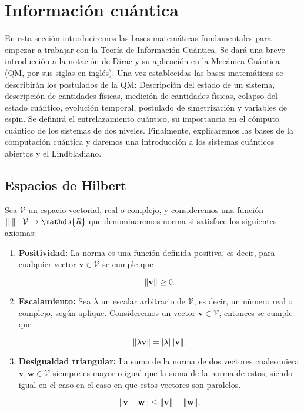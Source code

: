 \chapter{Información cuántica}

En esta sección introduciremos las bases matemáticas fundamentales para empezar a trabajar con la Teoría de Información Cuántica. Se dará una breve introducción a la notación de Dirac y su aplicación en la Mecánica Cuántica (QM, por sus siglas en inglés). Una vez establecidas las bases matemáticas se describirán los postulados de la QM: Descripción del estado de un sistema, descripción de cantidades físicas, medición de cantidades físicas, colapso del estado cuántico, evolución temporal, postulado de simetrización y variables de espín. Se definirá el entrelazamiento cuántico, su importancia en el cómputo cuántico de los sistemas de dos niveles. Finalmente, explicaremos las bases de la computación cuántica y daremos una introducción a los sistemas cuánticos abiertos y el Lindbladiano.

\section{Espacios de Hilbert}

Sea $\mathcal{V}$ un espacio vectorial, real o complejo, y consideremos una función $\norm{\cdot}: \mathcal{V} \rightarrow \mathds{R}$ que denominaremos norma si satisface los siguientes axiomas:

\begin{enumerate}
    \item \textbf{Positividad:} La norma es una función definida positiva, es decir, para cualquier vector $\mathbf{v} \in \mathcal{V}$ se cumple que

        \begin{equation}
            \norm{\mathbf{v}} \geq 0 .
        \end{equation}

    \item \textbf{Escalamiento:} Sea $\lambda$ un escalar arbitrario de $\mathcal{V}$, es decir, un número real o complejo, según aplique. Consideremos un vector $\mathbf{v} \in \mathcal{V}$, entonces se cumple que

        \begin{equation}
            \norm{\lambda \mathbf{v}} = \abs{\lambda} \norm{\mathbf{v}} .
        \end{equation}

    \item \textbf{Desigualdad triangular:} La suma de la norma de dos vectores cualesquiera $\mathbf{v}, \mathbf{w} \in \mathcal{V}$ siempre es mayor o igual que la suma de la norma de estos, siendo igual en el caso en el caso en que estos vectores son paralelos.

        \begin{equation}
            \norm{\mathbf{v} + \mathbf{w}} \leq \norm{\mathbf{v}} + \norm{\mathbf{w}} .
        \end{equation}

\end{enumerate}

